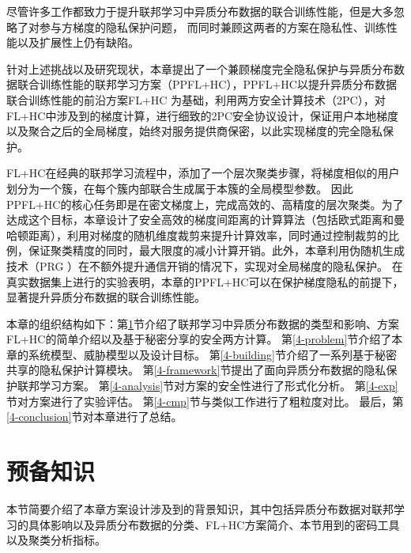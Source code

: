 尽管许多工作都致力于提升联邦学习中异质分布数据的联合训练性能，但是大多忽略了对参与方梯度的隐私保护问题，
而同时兼顾这两者的方案在隐私性、训练性能以及扩展性上仍有缺陷。



针对上述挑战以及研究现状，本章提出了一个兼顾梯度完全隐私保护与异质分布数据联合训练性能的联邦学习方案（PPFL+HC），PPFL+HC以提升异质分布数据联合训练性能的前沿方案FL+HC \cite{briggs2020federated} 为基础，利用两方安全计算技术（2PC），对FL+HC中涉及到的梯度计算，进行细致的2PC安全协议设计，保证用户本地梯度以及聚合之后的全局梯度，始终对服务提供商保密，以此实现梯度的完全隐私保护。

FL+HC在经典的联邦学习流程中，添加了一个层次聚类步骤，将梯度相似的用户划分为一个簇，在每个簇内部联合生成属于本簇的全局模型参数。
因此PPFL+HC的核心任务即是在密文梯度上，完成高效的、高精度的层次聚类。为了达成这个目标，本章设计了安全高效的梯度间距离的计算算法（包括欧式距离和曼哈顿距离），利用对梯度的随机维度裁剪来提升计算效率，同时通过控制裁剪的比例，保证聚类精度的同时，最大限度的减小计算开销。此外，本章利用伪随机生成技术（PRG \cite{yao1982theory}）在不额外提升通信开销的情况下，实现对全局梯度的隐私保护。
在真实数据集上进行的实验表明，本章的PPFL+HC可以在保护梯度隐私的前提下，显著提升异质分布数据的联合训练性能。

本章的组织结构如下：第\ref{4-pre}节介绍了联邦学习中异质分布数据的类型和影响、方案FL+HC的简单介绍以及基于秘密分享的安全两方计算。
第\ref{4-problem}节介绍了本章的系统模型、威胁模型以及设计目标。
第\ref{4-building}节介绍了一系列基于秘密共享的隐私保护计算模块。
第\ref{4-framework}节提出了面向异质分布数据的隐私保护联邦学习方案。
第\ref{4-analysis}节对方案的安全性进行了形式化分析。
第\ref{4-exp}节对方案进行了实验评估。
第\ref{4-cmp}节与类似工作进行了粗粒度对比。
最后，第\ref{4-conclusion}节对本章进行了总结。

\section{预备知识}\label{4-pre}
本节简要介绍了本章方案设计涉及到的背景知识，其中包括异质分布数据对联邦学习的具体影响以及异质分布数据的分类、FL+HC方案简介、本节用到的密码工具以及聚类分析指标。

